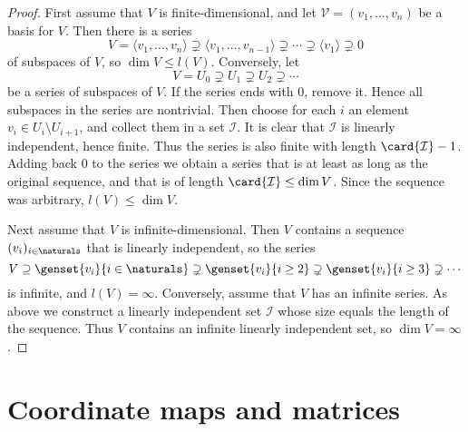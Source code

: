 \documentclass[a4paper, 11pt]{memoir}
\newcommand{\gen}[1]{\langle#1\rangle}
\theoremstyle{plaincustomnumber}
\theoremstyle{changedotbreakcustomnumber}
\newcommand{\calM}{\mathcal{M}}
\newcommand{\calL}{\mathcal{L}}
\newcommand{\calV}{\mathcal{V}}
\newcommand{\calI}{\mathcal{I}}
\begin{document}
\begin{proof}
    First assume that $V$ is finite-dimensional, and let $\calV = (v_1, \ldots, v_n)$ be a basis for $V$. Then there is a series
    \begin{equation*}
        V
            = \gen{v_1, \ldots, v_n}
            \supsetneq \gen{v_1, \ldots, v_{n-1}}
            \supsetneq \cdots
            \supsetneq \gen{v_1}
            \supsetneq 0
    \end{equation*}
    of subspaces of $V$, so $\dim V \leq l(V)$. Conversely, let
    \begin{equation*}
        V
            = U_0
            \supsetneq U_1
            \supsetneq U_2
            \supsetneq \cdots
    \end{equation*}
    be a series of subspaces of $V$. If the series ends with $0$, remove it. Hence all subspaces in the series are nontrivial. Then choose for each $i$ an element $v_i \in U_i \setminus U_{i+1}$, and collect them in a set $\calI$. It is clear that $\calI$ is linearly independent, hence finite. Thus the series is also finite with length $\card{\calI}-1$. Adding back $0$ to the series we obtain a series that is at least as long as the original sequence, and that is of length $\card{\calI} \leq \dim V$. Since the sequence was arbitrary, $l(V) \leq \dim V$.

    Next assume that $V$ is infinite-dimensional. Then $V$ contains a sequence $(v_i)_{i\in\naturals}$ that is linearly independent, so the series
    \begin{equation*}
        V
            \supseteq \genset{v_i}{i \in \naturals}
            \supsetneq \genset{v_i}{i \geq 2}
            \supsetneq \genset{v_i}{i \geq 3}
            \supsetneq \cdots
    \end{equation*}
    is infinite, and $l(V) = \infty$. Conversely, assume that $V$ has an infinite series. As above we construct a linearly independent set $\calI$ whose size equals the length of the sequence. Thus $V$ contains an infinite linearly independent set, so $\dim V = \infty$.
\end{proof}




\section{Coordinate maps and matrices}

\newcommand{\coordmap}[1]{\phi_{#1}}
\newcommand{\coordvec}[2]{[#1]_{#2}}
\newcommand{\basischange}[2]{\phi_{#1,#2}}
\newcommand{\mr}[3]{{}_{#1}[#2]_{#3}}
\newcommand{\basischangemat}[2]{\mr{#1}{\square}{#2}}
\newcommand{\lin}{\calL}
\newcommand{\smr}[1]{\calM(#1)} %
\end{document}
